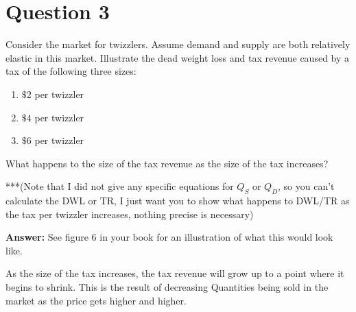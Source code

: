 \documentclass[12pt]{article}
\begin{document}
\section*{Question 3}
Consider the market for twizzlers. Assume demand and supply are both relatively elastic in this market. Illustrate the dead weight loss and tax revenue caused by a tax of the following three sizes:
\begin{enumerate}
    \item \(\$2\) per twizzler
    \item \(\$4\) per twizzler
    \item \(\$6\) per twizzler
\end{enumerate}

What happens to the size of the tax revenue as the size of the tax increases?

\vspace{3mm}

***(Note that I did not give any specific equations for $Q_S$ or $Q_D$, so you can't calculate the DWL or TR, I just want you to show what happens to DWL/TR as the tax per twizzler increases, nothing precise is necessary)

\vspace{4mm}

\textbf{Answer:}
See figure 6 in your book for an illustration of what this would look like. 

As the size of the tax increases, the tax revenue will grow up to a point where it begins to shrink. This is the result of decreasing Quantities being sold in the market as the price gets higher and higher. 
    
\end{document}
